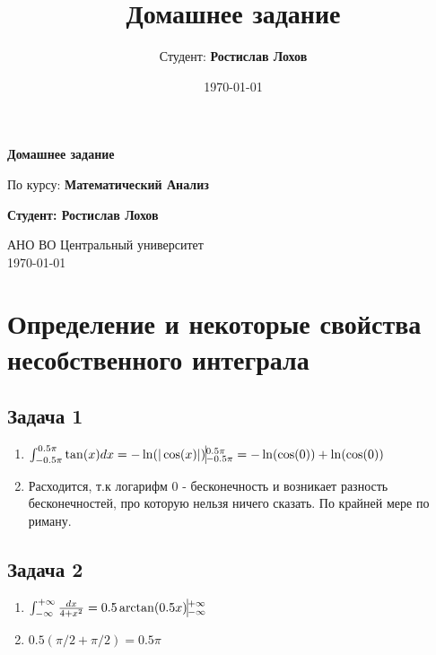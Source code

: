 \documentclass[a4paper,12pt]{article}
\title{Домашнее задание}
\author{Студент: \textbf{Ростислав Лохов}}
\date{\today}
\begin{document}
\begin{titlepage}
	\centering
	\vspace*{1cm}

	\Huge
	\textbf{Домашнее задание}

	\vspace{0.5cm}
	\LARGE
	По курсу: \textbf{Математический Анализ}

	\vspace{1.5cm}

	\textbf{Студент: Ростислав Лохов}

	\vfill

	\Large
	АНО ВО Центральный университет\\
	\vspace{0.3cm}
	\today

\end{titlepage}

\tableofcontents
\newpage

\section{Определение и некоторые свойства несобственного интеграла}

\subsection{Задача 1}

\begin{enumerate}
    \item $\int_{-0.5\pi}^{0.5\pi}\tan(x)dx = -\ln(|\cos(x)|) \vline_{-0.5\pi}^{0.5\pi} = -\ln(\cos(0))+\ln(\cos(0))$
    \item Расходится, т.к логарифм 0 - бесконечность и возникает разность бесконечностей, про которую нельзя ничего сказать. По крайней мере по риману.
\end{enumerate}

\subsection{Задача 2}

\begin{enumerate}
    \item $\int_{-\infty}^{+\infty} \frac{dx}{4+x^2} = 0.5\arctan(0.5x)\vline_{-\infty}^{+\infty}$
    \item $0.5 (\pi/2 + \pi/2) = 0.5\pi$
\end{enumerate}
\end{document}

